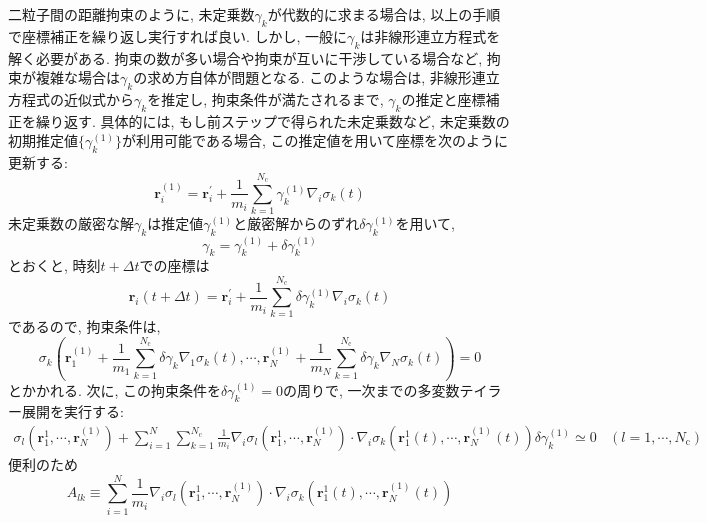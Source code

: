 二粒子間の距離拘束のように, 未定乗数$\gamma_{k}$が代数的に求まる場合は, 以上の手順で座標補正を繰り返し実行すれば良い. 
しかし, 一般に$\gamma_{k}$は非線形連立方程式を解く必要がある. 拘束の数が多い場合や拘束が互いに干渉している場合など, 拘束が複雑な場合は$\gamma_{k}$の求め方自体が問題となる. 
このような場合は, 非線形連立方程式の近似式から$\gamma_{k}$を推定し, 拘束条件が満たされるまで, $\gamma_{k}$の推定と座標補正を繰り返す. 
具体的には, もし前ステップで得られた未定乗数など, 未定乗数の初期推定値$\{\gamma_{k}^{(1)}\}$が利用可能である場合, この推定値を用いて座標を次のように更新する:
\begin{equation}
    \bm{r}_{i}^{(1)} =
    \bm{r}_{i}^{\prime} + \frac{1}{m_{i}} \sum_{k=1}^{N_{\mathrm{c}}} \gamma_{k}^{(1)} \nabla_{i} \sigma_{k}(t)
\end{equation}
未定乗数の厳密な解$\gamma_{k}$は推定値$\gamma_{k}^{(1)}$と厳密解からのずれ$\delta \gamma_{k}^{(1)}$を用いて, 
\begin{equation}
    \gamma_{k} = \gamma_{k}^{(1)} + \delta \gamma_{k}^{(1)}
\end{equation}
とおくと, 時刻$t + \Delta t$での座標は
\begin{equation}
    \bm{r}_{i} (t + \Delta t) =
    \bm{r}_{i}^{\prime} + \frac{1}{m_{i}} \sum_{k=1}^{N_{\mathrm{c}}} \delta \gamma_{k}^{(1)} \nabla_{i} \sigma_{k}(t)
\end{equation}
であるので, 拘束条件は, 
\begin{equation}
    \sigma_{k} \left( \bm{r}_{1}^{(1)} + \frac{1}{m_{1}} \sum_{k=1}^{N_{\mathrm{c}}} \delta \gamma_{k} \nabla_{1} \sigma_{k}(t), \cdots, \bm{r}_{N}^{(1)} + \frac{1}{m_{N}} \sum_{k=1}^{N_{\mathrm{c}}} \delta \gamma_{k} \nabla_{N} \sigma_{k}(t) \right) = 0
\end{equation}
とかかれる. 
次に, この拘束条件を$\delta \gamma_{k}^{(1)} = 0$の周りで, 一次までの多変数テイラー展開を実行する:
\begin{align}
    \sigma_{l}(\bm{r}_{1}^{1}, \cdots, \bm{r}_{N}^{(1)}) +
    \sum_{i=1}^{N} \sum_{k=1}^{N_{\mathrm{c}}} \frac{1}{m_{i}}
    \nabla_{i} \sigma_{l} (\bm{r}_{1}^{1}, \cdots, \bm{r}_{N}^{(1)}) \cdot
    \nabla_{i} \sigma_{k} (\bm{r}_{1}^{1}(t), \cdots, \bm{r}_{N}^{(1)}(t))
    \delta \gamma_{k}^{(1)}
    \simeq 0 ~~~~ (l = 1,\cdots,N_{\mathrm{c}})
\end{align}
便利のため
\begin{equation}
A_{lk} \equiv \sum_{i=1}^{N}\frac{1}{m_{i}}\nabla_{i} \sigma_{l} (\bm{r}_{1}^{1}, \cdots, \bm{r}_{N}^{(1)}) \cdot \nabla_{i} \sigma_{k} (\bm{r}_{1}^{1}(t), \cdots, \bm{r}_{N}^{(1)}(t))
\end{equation}
